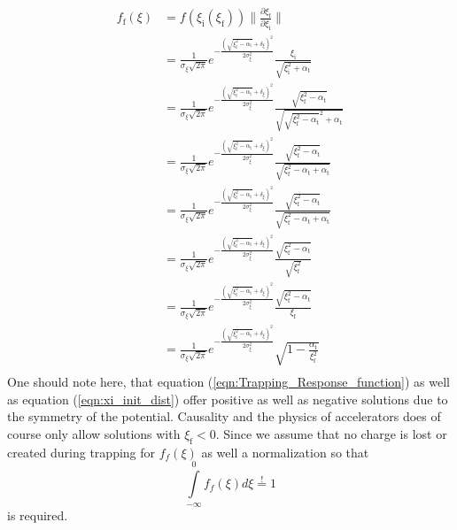 \begin{align}
f_\mathrm{f}(\xi)&=f(\xi_\mathrm{i}(\xi_\mathrm{f}))\| \frac{\partial \xi_\mathrm{f}}{\partial \xi_\mathrm{i}}\| \\
&=\frac{1}{\sigma_\xi \sqrt{2\pi}}e^{-\frac{(\sqrt{\xi_\mathrm{f}^2-\alpha_\mathrm{t}}+\delta_\xi)^2}{2\sigma_\xi^2}} \frac{\xi_\mathrm{i}}{\sqrt{\xi_\mathrm{i}^2+\alpha_\mathrm{t}}}\\
&=\frac{1}{\sigma_\xi \sqrt{2\pi}}e^{-\frac{(\sqrt{\xi_\mathrm{f}^2-\alpha_\mathrm{t}}+\delta_\xi)^2}{2\sigma_\xi^2}} \frac{\sqrt{\xi_\mathrm{f}^2-\alpha_\mathrm{t}}}{\sqrt{\sqrt{\xi_\mathrm{f}^2-\alpha_\mathrm{t}}^2+\alpha_\mathrm{t}}}\\
&=\frac{1}{\sigma_\xi \sqrt{2\pi}}e^{-\frac{(\sqrt{\xi_\mathrm{f}^2-\alpha_\mathrm{t}}+\delta_\xi)^2}{2\sigma_\xi^2}} \frac{\sqrt{\xi_\mathrm{f}^2-\alpha_\mathrm{t}}}{\sqrt{\xi_\mathrm{f}^2-\alpha_\mathrm{t}+\alpha_\mathrm{t}}}\\
&=\frac{1}{\sigma_\xi \sqrt{2\pi}}e^{-\frac{(\sqrt{\xi_\mathrm{f}^2-\alpha_\mathrm{t}}+\delta_\xi)^2}{2\sigma_\xi^2}} \frac{\sqrt{\xi_\mathrm{f}^2-\alpha_\mathrm{t}}}{\sqrt{\xi_\mathrm{f}^2-\alpha_\mathrm{t}+\alpha_\mathrm{t}}}\\
&=\frac{1}{\sigma_\xi \sqrt{2\pi}}e^{-\frac{(\sqrt{\xi_\mathrm{f}^2-\alpha_\mathrm{t}}+\delta_\xi)^2}{2\sigma_\xi^2}} \frac{\sqrt{\xi_\mathrm{f}^2-\alpha_\mathrm{t}}}{\sqrt{\xi_\mathrm{f}^2}}\\
&=\frac{1}{\sigma_\xi \sqrt{2\pi}}e^{-\frac{(\sqrt{\xi_\mathrm{f}^2-\alpha_\mathrm{t}}+\delta_\xi)^2}{2\sigma_\xi^2}} \frac{\sqrt{\xi_\mathrm{f}^2-\alpha_\mathrm{t}}}{\xi_\mathrm{f}}\\
\label{eqn:Trapping_Response_function}
&=\frac{1}{\sigma_\xi \sqrt{2\pi}}e^{-\frac{(\sqrt{\xi_\mathrm{f}^2-\alpha_\mathrm{t}}+\delta_\xi)^2}{2\sigma_\xi^2}}
\sqrt{1-\frac{\alpha_\mathrm{t}}{\xi_\mathrm{f}^2}}\\
\end{align} 
One should note here, that equation (\ref{eqn:Trapping_Response_function}) as well as equation (\ref{eqn:xi_init_dist}) offer positive as well as negative solutions due to the symmetry of the potential. Causality and the physics of accelerators does of course only allow solutions with $\xi_\mathrm{f}<0$. Since we assume that no charge is lost or created during trapping for $f_f(\xi)$ as well a normalization so that
\begin{equation}
\int \limits_{-\infty}^{0} f_f(\xi)d\xi\stackrel{!}{=}1
\end{equation}
is required.

